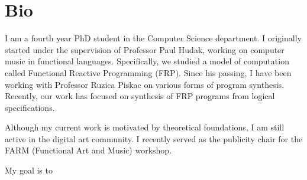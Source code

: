 \section{Bio}

I am a fourth year PhD student in the Computer Science department.
I originally started under the supervision of Professor Paul Hudak, working on computer music in functional languages.
Specifically, we studied a model of computation called Functional Reactive Programming (FRP).
Since his passing, I have been working with Professor Ruzica Piskac on various forms of program synthesis.
Recently, our work has focused on synthesis of FRP programs from logical specifications.

Although my current work is motivated by theoretical foundations, I am still active in the digital art community.
I recently served as the publicity chair for the FARM (Functional Art and Music) workshop.

My goal is to
